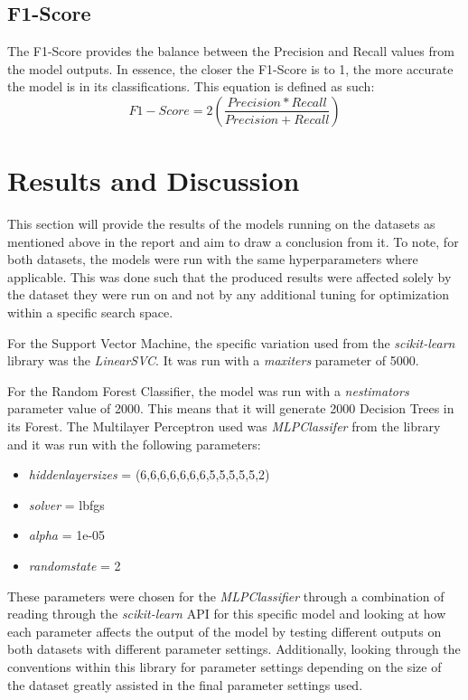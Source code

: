 \documentclass[11pt, a4paper]{article}
\begin{document}
\subsection{F1-Score}
The F1-Score provides the balance between the Precision and Recall values from the model outputs. In essence, the closer the F1-Score is to 1, the more accurate the model is in its classifications. This equation is defined as such:\\
\begin{equation}
F1-Score = 2 \left(\frac{Precision * Recall}{Precision + Recall}\right)
\end{equation}

\section{Results and Discussion}

This section will provide the results of the models running on the datasets as mentioned above in the report and aim to draw a conclusion from it. To note, for both datasets, the models were run with the same hyperparameters where applicable. This was done such that the produced results were affected solely by the dataset they were run on and not by any additional tuning for optimization within a specific search space. 

For the Support Vector Machine, the specific variation used from the \emph{scikit-learn} library was the \emph{LinearSVC}. It was run with a \emph{max\textunderscore iters} parameter of 5000. 

For the Random Forest Classifier, the model was run with a \emph{n\textunderscore estimators} parameter value of 2000. This means that it will generate 2000 Decision Trees in its Forest.
\newpage
The Multilayer Perceptron used was \emph{MLPClassifer} from the library and it was run with the following parameters:\\
\begin{itemize}
\item \emph{hidden\textunderscore layer\textunderscore sizes} = (6,6,6,6,6,6,6,5,5,5,5,5,2)
\item \emph{solver} = lbfgs
\item \emph{alpha} = 1e-05
\item \emph{random\textunderscore state} = 2
\end{itemize}

These parameters were chosen for the \emph{MLPClassifier} through a combination of reading through the \emph{scikit-learn} API for this specific model and looking at how each parameter affects the output of the model by testing different outputs on both datasets with different parameter settings. Additionally, looking through the conventions within this library for parameter settings depending on the size of the dataset greatly assisted in the final parameter settings used. 
\end{document}
